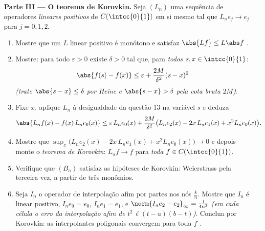 \begin{problem}
\medskip
\noindent\textbf{Parte III --- O teorema de Korovkin.} Seja $(L_n)$
uma sequência de operadores \emph{lineares positivos} de
$C(\intcc{0}{1})$ em si mesmo tal que $L_ne_j \to e_j$
 para $j = 0, 1, 2$.
\begin{enumerate}[resume]
  \item Mostre que um $L$ linear positivo é monótono e
        satisfaz $\abs{Lf} \leq L\abs f$ .
  \item Mostre: para todo $\varepsilon > 0$ existe $\delta > 0$
        tal que, para \emph{todos} $s, x \in \intcc{0}{1}$:
        \[
        \abs{f(s) - f(x)} \leq \varepsilon +
        \frac{2M}{\delta^2}(s - x)^2
        \]
        \emph{(trate $\abs{s - x} \leq \delta$ por Heine e
        $\abs{s-x} > \delta$ pela cota bruta $2M$)}.
  \item Fixe $x$, aplique $L_n$ à desigualdade da questão 13
        na variável $s$ e deduza
        \[
        \abs{L_nf(x) - f(x)\,L_ne_0(x)}
        \leq \varepsilon\,L_ne_0(x) + \frac{2M}{\delta^2}
        \bigl(L_ne_2(x) - 2x\,L_ne_1(x) + x^2 L_ne_0(x)\bigr).
        \]
  \item Mostre que $\sup_x \bigl(L_ne_2(x) - 2x\,L_ne_1(x) + x^2
        L_ne_0(x)\bigr) \to 0$ e depois monte
        o \emph{teorema de Korovkin}: $L_nf \to f$  para
        \emph{toda} $f \in C(\intcc{0}{1})$.
  \item Verifique que $(B_n)$ satisfaz as hipóteses de Korovkin:
        Weierstrass pela terceira vez, a partir de três monômios.
  \item Seja $I_n$ o operador de interpolação afim por partes
        nos nós $\frac kn$. Mostre que $I_n$ é
        linear positivo, $I_ne_0 = e_0$, $I_ne_1 = e_1$, e
        $\norm{I_ne_2 - e_2}_\infty = \frac{1}{4n^2}$
        \emph{(em cada célula o erro da interpolação afim
        de $t^2$ é $(t - a)(b - t)$)}. Conclua por Korovkin:
        as interpolantes poligonais convergem  para toda
        $f$ .
\end{enumerate}


\end{problem}

